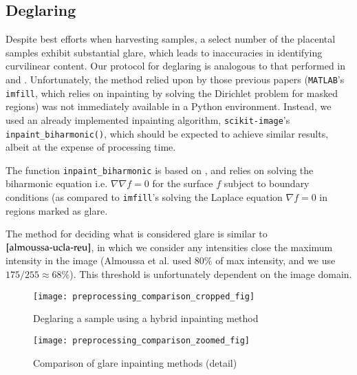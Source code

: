 		    \subsection{Deglaring}
    
    Despite best efforts when harvesting samples, a select number of the placental samples exhibit substantial glare, which leads to inaccuracies in identifying curvilinear content. Our protocol for deglaring is analogous to that performed in \cite{almoussa-ucla-reu} and \cite{huynh2013filter}. Unfortunately, the method relied upon by those previous papers (\texttt{MATLAB}'s \texttt{imfill}, which relies on inpainting by solving the Dirichlet problem for masked regions) was not immediately available in a Python environment. Instead, we used an already implemented inpainting algorithm, \texttt{scikit-image}'s \texttt{inpaint\_biharmonic()}, which should be expected to achieve similar results, albeit at the expense of processing time.
    
    The function \texttt{inpaint\_biharmonic} is based on \cite{damelin2018surface}, and relies on solving the biharmonic equation i.e. $\nabla \nabla f = 0$
    for the surface $f$ subject to boundary conditions (as
    compared to \texttt{imfill}'s solving the Laplace equation $\nabla f = 0$ in regions marked as glare.
    
    The method for deciding what is considered glare is similar to $\cite{almoussa-ucla-reu}$, in which we
    consider any intensities close the maximum intensity in the image (Almoussa et al. used $80\%$ of max intensity, and we use $175/255 \approx 68\%$). This threshold is unfortunately dependent on the image domain.
    
        \begin{figure} 
        \texttt{[image: preprocessing\_comparison\_cropped\_fig]}
        \caption{Deglaring a sample using a hybrid inpainting method}
        \label{fig:glare-example-crop}
        \end{figure}

        \begin{figure}[t] \centering
        \texttt{[image: preprocessing\_comparison\_zoomed\_fig]}
        \caption{Comparison of glare inpainting methods (detail)}
        \label{fig:glare-example-zoom}
        \end{figure}
    
